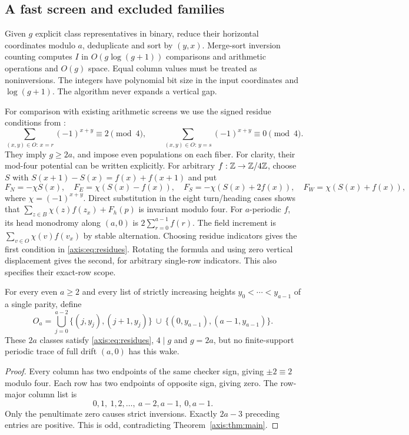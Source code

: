 \subsection{A fast screen and excluded families}\label{axis:sec:families}
Given $g$ explicit class representatives in binary, reduce their horizontal
coordinates modulo $a$, deduplicate and sort by $(y,x)$. Merge-sort inversion
counting computes $I$ in $O(g\log(g+1))$ comparisons and arithmetic operations
and $O(g)$ space. Equal column values must be treated as noninversions.
The integers have polynomial bit size in the input coordinates and $\log(g+1)$.
The algorithm never expands a vertical gap.

For comparison with existing arithmetic screens we use the signed residue
conditions from \cite{Jillhewar2026}:
\begin{equation}\label{axis:eq:residues}
 \sum_{(x,y)\in O:\,x=r}(-1)^{x+y}\equiv2\pmod4,
 \qquad
 \sum_{(x,y)\in O:\,y=s}(-1)^{x+y}\equiv0\pmod4.
\end{equation}
They imply $g\ge2a$, and impose even populations on each fiber. For clarity,
their mod-four potential can be written explicitly. For arbitrary
$f:\mathbb Z\to\mathbb Z/4\mathbb Z$, choose $S$ with $S(x+1)-S(x)=f(x)+f(x+1)$ and put
\[
 F_N=-\chi S(x),\quad F_E=\chi(S(x)-f(x)),\quad
 F_S=-\chi(S(x)+2f(x)),\quad F_W=\chi(S(x)+f(x)),
\]
where $\chi=(-1)^{x+y}$. Direct substitution in the eight turn/heading cases
shows that $\sum_{z\in B}\chi(z)f(z_x)+F_h(p)$ is invariant modulo four.
For $a$-periodic $f$, its head monodromy along $(a,0)$ is $2\sum_{r=0}^{a-1}f(r)$.
The field increment is $\sum_{v\in O}\chi(v)f(v_x)$ by stable alternation.
Choosing residue indicators gives the first condition in \eqref{axis:eq:residues}.
Rotating the formula and using zero vertical displacement gives the second,
for arbitrary single-row indicators. This also specifies their exact-row scope.

\begin{theorem}\label{axis:thm:staircase}
For every even $a\ge2$ and every list of strictly increasing heights
$y_0<\cdots<y_{a-1}$ of a single parity, define
\[
 O_a=\bigcup_{j=0}^{a-2}\{(j,y_j),(j+1,y_j)\}
 \ \cup\ \{(0,y_{a-1}),(a-1,y_{a-1})\}.
\]
These $2a$ classes satisfy \eqref{axis:eq:residues}, $4\mid g$ and $g=2a$, but
no finite-support periodic trace of full drift $(a,0)$ has this wake.
\end{theorem}
\begin{proof}
Every column has two endpoints of the same checker sign, giving $\pm2\equiv2$
modulo four. Each row has two endpoints of opposite sign, giving zero.
The row-major column list is
\[
 0,1,\ 1,2,\ldots,\ a-2,a-1,\ 0,a-1.
\]
Only the penultimate zero causes strict inversions. Exactly $2a-3$ preceding
entries are positive. This is odd, contradicting Theorem~\ref{axis:thm:main}.
\end{proof}

